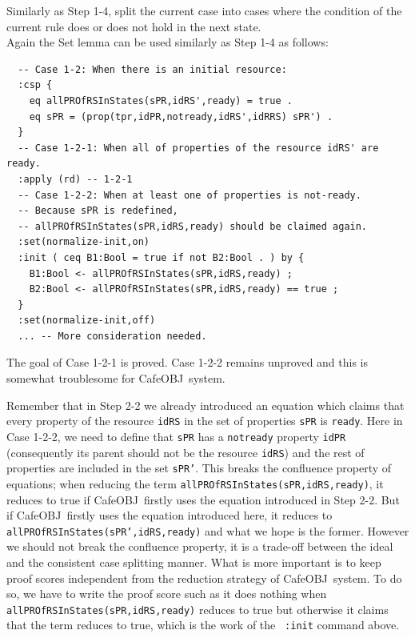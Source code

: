 \documentclass[12pt]{report}
\newcommand{\stt}[1]{{\small{\tt {#1}}}}
\newcommand{\cafeobj}{{\sf CafeOBJ}~}
\begin{document}
 Similarly as Step 1-4, split the current case
into cases where the condition of the current rule does or does not
hold in the next state. \\
Again the Set lemma can be used similarly as Step 1-4 as follows:
\small
\begin{verbatim}
  -- Case 1-2: When there is an initial resource:
  :csp {
    eq allPROfRSInStates(sPR,idRS',ready) = true .
    eq sPR = (prop(tpr,idPR,notready,idRS',idRRS) sPR') .
  }
  -- Case 1-2-1: When all of properties of the resource idRS' are ready.
  :apply (rd) -- 1-2-1
  -- Case 1-2-2: When at least one of properties is not-ready.
  -- Because sPR is redefined, 
  -- allPROfRSInStates(sPR,idRS,ready) should be claimed again.
  :set(normalize-init,on)
  :init ( ceq B1:Bool = true if not B2:Bool . ) by {
    B1:Bool <- allPROfRSInStates(sPR,idRS,ready) ;
    B2:Bool <- allPROfRSInStates(sPR,idRS,ready) == true ;
  }
  :set(normalize-init,off)
  ... -- More consideration needed.
\end{verbatim}
\normalsize
The goal of Case 1-2-1 is proved. Case 1-2-2 remains unproved and this is somewhat
troublesome for \cafeobj system.

Remember that in Step 2-2 we already introduced an equation which
claims that every property of the resource {\tt idRS} in the set of
properties {\tt sPR} is {\tt ready}. Here in Case 1-2-2, we need to
define that {\tt sPR} has a {\tt notready} property {\tt idPR}
(consequently its parent should not be the resource {\tt idRS}) and
the rest of properties are included in the set {\tt sPR'}. This breaks
the confluence property of equations; when reducing the term
\stt{allPROfRSInStates(sPR,idRS,ready)}, it reduces to true if
\cafeobj firstly uses the equation introduced in Step 2-2. But if
\cafeobj firstly uses the equation introduced here, it reduces to
\stt{allPROfRSInStates(sPR',idRS,ready)} and what we hope is the
former. However we should not break the confluence property, it is a
trade-off between the ideal and the consistent case splitting manner.
What is more important is to keep proof scores independent from the
reduction strategy of \cafeobj system. To do so, we have to write the
proof score such as it does nothing when
\stt{allPROfRSInStates(sPR,idRS,ready)} reduces to true but otherwise
it claims that the term reduces to true, which is the work of the {\tt
  :init} command above.
\end{document}
